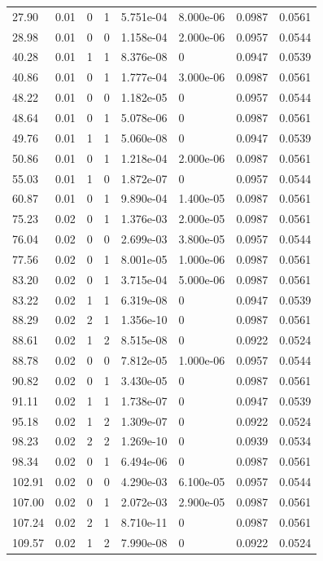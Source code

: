 \documentclass[preview]{standalone}
\begin{document}
{{\begin{tabular}{L{1.2cm}C{1.2cm} C{0.3cm}C{0.5cm} C{1.4cm}C{1.4cm} C{1.4cm}C{1.4cm}}
  27.90  &  0.01  & 0     &  1 &  5.751e-04  & 8.000e-06  & 0.0987 &  0.0561   \\ 
  28.98  &  0.01  & 0     &  0 &  1.158e-04  & 2.000e-06  & 0.0957 &  0.0544   \\ 
  40.28  &  0.01  & 1     &  1 &  8.376e-08  & 0  & 0.0947 &  0.0539   \\ 
  40.86  &  0.01  & 0     &  1 &  1.777e-04  & 3.000e-06  & 0.0987 &  0.0561   \\ 
  48.22  &  0.01  & 0     &  0 &  1.182e-05  & 0  & 0.0957 &  0.0544   \\ 
  48.64  &  0.01  & 0     &  1 &  5.078e-06  & 0  & 0.0987 &  0.0561   \\ 
  49.76  &  0.01  & 1     &  1 &  5.060e-08  & 0  & 0.0947 &  0.0539   \\ 
  50.86  &  0.01  & 0     &  1 &  1.218e-04  & 2.000e-06  & 0.0987 &  0.0561   \\ 
  55.03  &  0.01  & 1     &  0 &  1.872e-07  & 0  & 0.0957 &  0.0544   \\ 
  60.87  &  0.01  & 0     &  1 &  9.890e-04  & 1.400e-05  & 0.0987 &  0.0561   \\ 
  75.23  &  0.02  & 0     &  1 &  1.376e-03  & 2.000e-05  & 0.0987 &  0.0561   \\ 
  76.04  &  0.02  & 0     &  0 &  2.699e-03  & 3.800e-05  & 0.0957 &  0.0544   \\ 
  77.56  &  0.02  & 0     &  1 &  8.001e-05  & 1.000e-06  & 0.0987 &  0.0561   \\ 
  83.20  &  0.02  & 0     &  1 &  3.715e-04  & 5.000e-06  & 0.0987 &  0.0561   \\ 
  83.22  &  0.02  & 1     &  1 &  6.319e-08  & 0  & 0.0947 &  0.0539   \\ 
  88.29  &  0.02  & 2     &  1 &  1.356e-10  & 0  & 0.0987 &  0.0561   \\ 
  88.61  &  0.02  & 1     &  2 &  8.515e-08  & 0  & 0.0922 &  0.0524   \\ 
  88.78  &  0.02  & 0     &  0 &  7.812e-05  & 1.000e-06  & 0.0957 &  0.0544   \\ 
  90.82  &  0.02  & 0     &  1 &  3.430e-05  & 0  & 0.0987 &  0.0561   \\ 
  91.11  &  0.02  & 1     &  1 &  1.738e-07  & 0  & 0.0947 &  0.0539   \\ 
  95.18  &  0.02  & 1     &  2 &  1.309e-07  & 0  & 0.0922 &  0.0524   \\ 
  98.23  &  0.02  & 2     &  2 &  1.269e-10  & 0  & 0.0939 &  0.0534   \\ 
  98.34  &  0.02  & 0     &  1 &  6.494e-06  & 0  & 0.0987 &  0.0561   \\ 
  102.91  &  0.02  & 0     &  0 &  4.290e-03  & 6.100e-05  & 0.0957 &  0.0544   \\ 
  107.00  &  0.02  & 0     &  1 &  2.072e-03  & 2.900e-05  & 0.0987 &  0.0561   \\ 
  107.24  &  0.02  & 2     &  1 &  8.710e-11  & 0  & 0.0987 &  0.0561   \\ 
  109.57  &  0.02  & 1     &  2 &  7.990e-08  & 0  & 0.0922 &  0.0524   \\ 
\hline 
\end{tabular} 

}}
\end{document}
